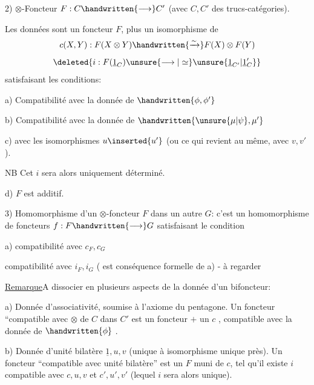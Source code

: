2) $\otimes$-Foncteur $F:C\handwritten{\longrightarrow}C'$ (avec $C,C'$ des trucs-catégories).

Les données sont un foncteur  $F$, plus un isomorphisme de 
\[
c(X,Y):F(X\otimes Y)\handwritten{\xrightarrow{\sim}}F(X)\otimes F(Y)
\]
\[
\deleted{i:F(\underline{1}_C)\unsure{\longrightarrow|\simeq}\unsure{\underline{1}_{C'}|\underline{1}'_C}}
\]
satisfaisant les conditions:

a) Compatibilité  avec la donnée de $\handwritten{\phi,\phi'}$

b) Compatibilité  avec la donnée de $\handwritten{\unsure{\mu|\psi},\mu'}$

c)  avec les isomorphismes $u\inserted{u'}$ (ou ce  qui revient au même, avec  $v,v'$).

NB Cet $i$ sera alors uniquement déterminé.

d) $F$ est additif.

3) Homomorphisme d'un $\otimes$-foncteur $F$ dans un autre $G$: c'est un homomorphisme de foncteurs $f:F\handwritten{\longrightarrow}G$ satisfaisant le condition

a) compatibilité avec  $c_F,c_G$


 compatibilité avec $i_F,i_G$ ( est  conséquence formelle de a) - à regarder\deleted{)}

 \uline{Remarque}\qquad A dissocier  en plusieurs aspects de la donnée d'un bifoncteur\handwritten{$\otimes$}:

a) Donnée d'associativité, soumise à l'axiome du pentagone. Un foncteur ``compatible avec $\otimes$ de $C$ dans $C'$ est un foncteur $+$ un $c$ , compatible avec la donnée de $\handwritten{\phi}$ .

b) Donnée d'unité bilatère $\underline{1},u,v$ (unique à isomorphisme unique près). Un foncteur ``compatible avec  unité bilatère'' est un $F$ muni de $c$, tel qu'il existe $i$ compatible avec $c,u,v$ et $c',u',v'$ (lequel $i$ sera alors unique).

